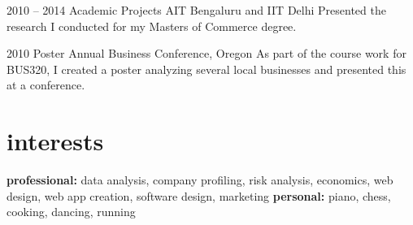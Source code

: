 \documentclass[print]{friggeri-cv} %
\begin{document}
\begin{entrylist}


\entry
{2010 -- 2014}
{Academic Projects}
{AIT Bengaluru and IIT Delhi}
{Presented the research I conducted for my Masters of Commerce degree.}


\entry
{2010}
{Poster}
{Annual Business Conference, Oregon}
{As part of the course work for BUS320, I created a poster analyzing several local businesses and presented this at a conference.}


\end{entrylist}


\section{interests}

\textbf{professional:} data analysis, company profiling, risk analysis, economics, web design, web app creation, software design, marketing \textbf{personal:} piano, chess, cooking, dancing, running


\end{document}
